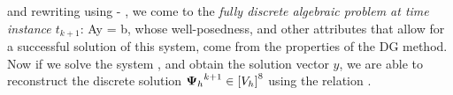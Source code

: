 and rewriting  using  - , we come to the \textit{fully discrete algebraic problem at time instance $t_{k+1}$}:
\be
\label{Alg} Ay = b,
\ee
whose well-posedness, and other attributes that allow for a successful solution of this system, come from the properties of the DG method.
Now if we solve the system , and obtain the solution vector $y$, we are able to reconstruct the discrete solution ${\mathrm{\mathbf{\Psi}}_h}^{k+1} \in \left[V_h\right]^8$ using the relation .
